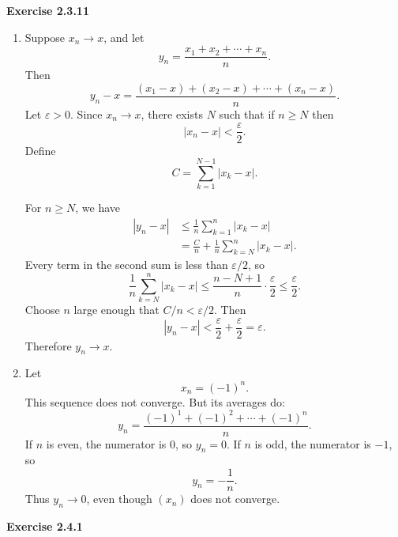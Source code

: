 \documentclass[12pt]{article}
\begin{document}
\noindent{} \textbf{Exercise 2.3.11}
\begin{enumerate}
    \item [(a)]Suppose \(x_n\to x\), and let
          \[
              y_n=\frac{x_1+x_2+\cdots+x_n}{n}.
          \]Then
          \[
              y_n-x
              =
              \frac{(x_1-x)+(x_2-x)+\cdots+(x_n-x)}{n}.
          \]
          Let $\varepsilon > 0$.
          Since $x_n \to x$, there exists $N$ such that if $n \geq N$ then
          \[
              |x_n - x| < \frac{\varepsilon}{2}.
          \]
          Define
          \[
              C=\sum_{k=1}^{N-1}|x_k-x|.
          \]

          For $n \geq N$, we have
          \[
              \begin{aligned}
                  |y_n - x| & \leq \frac{1}{n}\sum_{k=1}^{n}|x_k - x|             \\
                            & = \frac{C}{n} + \frac{1}{n}\sum_{k=N}^{n}|x_k - x|.
              \end{aligned}
          \]
          Every term in the second sum is less than \(\varepsilon/2\), so
          \[
              \frac{1}{n}\sum_{k=N}^n |x_k-x|
              \leq \frac{n-N+1}{n}\cdot\frac{\varepsilon}{2}
              \leq \frac{\varepsilon}{2}.
          \]
          Choose \(n\) large enough that \(C/n<\varepsilon/2\). Then
          \[
              |y_n-x|<\frac{\varepsilon}{2}+\frac{\varepsilon}{2}
              =\varepsilon.
          \]
          Therefore \(y_n\to x\).
    \item [(b)]
          Let
          \[
              x_n=(-1)^n.
          \]This sequence does not converge. But its averages do:
          \[
              y_n=\frac{(-1)^1+(-1)^2+\cdots+(-1)^n}{n}.
          \]If \(n\) is even, the numerator is \(0\), so \(y_n=0\). If \(n\) is odd, the numerator is \(-1\), so
          \[
              y_n=-\frac1n.
          \]Thus \(y_n\to0\), even though \((x_n)\) does not converge.
\end{enumerate}

\noindent{}\textbf{Exercise 2.4.1}
\end{document}
